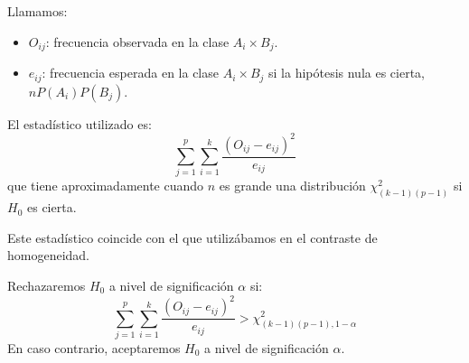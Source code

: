 Llamamos:
\begin{itemize}
    \item $O_{ij}$: frecuencia observada en la clase $A_i \times B_j$.
    \item $e_{ij}$: frecuencia esperada en la clase $A_i \times B_j$ si la hipótesis nula es cierta, $nP(A_i)P(B_j)$.
\end{itemize}

El estadístico utilizado es:
$$\sum_{j=1}^p \sum_{i=1}^k \frac{(O_{ij}-e_{ij})^2}{e_{ij}}$$
que tiene aproximadamente cuando $n$ es grande una distribución $\chi^2_{(k-1)(p-1)}$ si $H_0$ es cierta.

\begin{remark}
    Este estadístico coincide con el que utilizábamos en el contraste de homogeneidad.
\end{remark}

Rechazaremos $H_0$ a nivel de significación $\alpha$ si:
$$\sum_{j=1}^p \sum_{i=1}^k \frac{(O_{ij}-e_{ij})^2}{e_{ij}} > \chi^2_{(k-1)(p-1), 1-\alpha}$$
En caso contrario, aceptaremos $H_0$ a nivel de significación $\alpha$.

